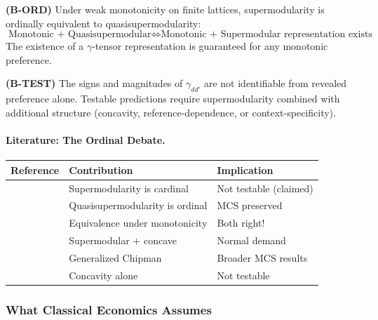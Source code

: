 \begin{axiom}
\label{ax:B-ORD}
\textbf{(B-ORD)} Under weak monotonicity on finite lattices, supermodularity 
is ordinally equivalent to quasisupermodularity:
\begin{equation}
    \text{Monotonic + Quasisupermodular} \Leftrightarrow 
    \text{Monotonic + Supermodular representation exists}
\end{equation}
The existence of a $\gamma$-tensor representation is guaranteed for any 
monotonic preference.
\end{axiom}

\begin{axiom}
\label{ax:B-TEST}
\textbf{(B-TEST)} The signs and magnitudes of $\gamma_{dd'}$ are not 
identifiable from revealed preference alone. Testable predictions require 
supermodularity combined with additional structure (concavity, 
reference-dependence, or context-specificity).
\end{axiom}

\paragraph{Literature: The Ordinal Debate.}

\begin{center}
\renewcommand{\arraystretch}{1.3}
\begin{tabular}{|l|l|l|}
\hline
\textbf{Reference} & \textbf{Contribution} & \textbf{Implication} \\
\hline
\citet{samuelson1947} & Supermodularity is cardinal & Not testable (claimed) \\
\citet{milgrom1994monotone} & Quasisupermodularity is ordinal & MCS preserved \\
\citet{chambers2009supermodularity} & Equivalence under monotonicity & Both right! \\
\citet{chipman1977} & Supermodular + concave & Normal demand \\
\citet{quah2007} & Generalized Chipman & Broader MCS results \\
\citet{afriat1967} & Concavity alone & Not testable \\
\hline
\end{tabular}
\end{center}



\subsubsection{What Classical Economics Assumes}

